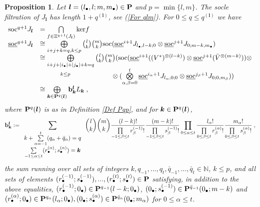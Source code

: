 \documentclass[12pt]{article}
\def\NN {{\mathbb N}}     %
\def\ul  {\underline}
\newtheorem{prop}[theorem]{Proposition}
\begin{document}
\begin{prop}\label{Prop socqJlm}
Let $\bm l=(l_\bullet,l;m,m_\bullet)\in{\bf P}$ and $p=\min\{l,m\}$. The socle filtration of $J_{\bm l}$ has length $1+q^{(\bm l)}$, see (\ref{For qlm}). For $0\leq q\leq q^{(\bm l)}$ we have
\begin{gather*}
\begin{array}{rl}
{\rm soc}^{q+1}J_{\bm l}& = \bigcap\limits_{f\in\Xi^{q+1}(J_{\bm l})} {\rm ker}f \\
\ul{\rm soc}^{q+1}J_{\bm l}& \cong \bigoplus\limits_{i+j+k=q,k\leq p} \binom{l}{k}\binom{m}{k} {\rm soc}(\ul{\rm soc}^{i+1}J_{l_\bullet,l-k;0}\otimes \ul{\rm soc}^{j+1}J_{0;m-k,m_\bullet}) \\
& \cong \bigoplus\limits_{i+j+|i_\bullet|+|j_\bullet|+k=q} \binom{l}{k}\binom{m}{k} ( {\rm soc}(\ul{\rm soc}^{i+1}((V^*)^{\otimes(l-k)})\otimes\ul{\rm soc}^{j+1}(\bar V^{\otimes(m-k)})) \otimes \\
& \qquad\quad {^{k\leq p}} \qquad\qquad\qquad \otimes (\bigotimes\limits_{\alpha,\beta=0}^t\ul{\rm soc}^{i_{\alpha}+1}J_{l_\alpha,0;0}\otimes \ul{\rm soc}^{j_\beta+1}J_{0;0,m_\beta}) ) \\
& \cong \bigoplus\limits_{\bm k\in{\bf P}^q(\bm l)} {\bf b}^{\bm l}_{\bm k}  L_{\bm k} \;,
\end{array}
\end{gather*}
where ${\bf P}^q(\bm l)$ is as in Definition \ref{Def Pqp}, and for $\bm k\in{\bf P}^q(\bm l)$,
$$
{\bf b}^{\bm l}_{\bm k}:=\sum\limits_{\begin{array}{c}k+\sum\limits_{\alpha=-1}^t (q_\alpha+\bar q_\alpha)=q \\
\sum\limits_{-1\leq\alpha\leq t} (r^{(\alpha)}_\bullet;s^{(\alpha)}_\bullet)=\bm k\end{array}} \binom{l}{k}\binom{m}{k} \frac{(l-k)!}{\prod\limits_{-1\leq \beta\leq t}r^{(-1)}_\beta!}\frac{(m-k)!}{\prod\limits_{-1\leq \beta\leq t}s^{(-1)}_\beta!} \prod\limits_{0\leq\alpha\leq t} \frac{l_\alpha!}{\prod\limits_{0\leq \beta\leq t}r^{(\alpha)}_\beta!} \frac{m_\alpha!}{\prod\limits_{0\leq \beta\leq t}s^{(\alpha)}_\beta!} \;,
$$
the sum running over all sets of integers $k,q_{-1},...,q_t,\bar q_{-1},...,\bar q_t\in\NN$, $k\leq p$, and all sets of elements $(r^{(-1)}_\bullet;s^{(-1)}_\bullet),...,(r^{(t)}_\bullet;s^{(t)}_\bullet)\in{\bf P}$ satisfying, in addition to the above equalities, $(r^{(-1)}_\bullet;0_\bullet)\in{\bf P}^{q_{-1}}(l-k;0_\bullet)$, $(0_\bullet;s^{(-1)}_\bullet)\in{\bf P}^{\bar q_{-1}}(0_\bullet;m-k)$ and $(r^{(\alpha)}_\bullet;0_\bullet)\in{\bf P}^{q_\alpha}(l_\alpha;0_\bullet),(0_\bullet;s^{(\alpha)}_\bullet)\in{\bf P}^{\bar q_\alpha}(0_\bullet;m_\alpha)$ for $0\leq \alpha\leq t$.
\end{prop}
\end{document}
